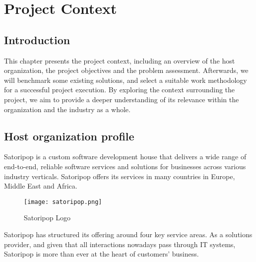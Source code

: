 \chapter{Project Context}
\section*{Introduction}
This chapter presents the project context, including an overview of the host organization, 
the project objectives and the problem assessment. Afterwards, we will benchmark some existing 
solutions, and select a suitable work methodology for a successful project execution. 
By exploring the context surrounding the project, we aim to provide a deeper understanding of 
its relevance within the organization and the industry as a whole.

\section{Host organization profile}

Satoripop is a custom software development house that delivers a wide range of end-to-end, 
reliable software services and solutions for businesses across various industry verticals.
Satoripop offers its services in many countries in Europe, Middle East and Africa.

\begin{figure}[hbt!]
    \centering
    \texttt{[image: satoripop.png]}
    \caption{Satoripop Logo}
    \label{fig:sp-logo}
\end{figure}

Satoripop has structured its offering around four key service areas. As a solutions provider, 
and given that all interactions nowadays pass through IT systems, Satoripop is more than ever at the 
heart of customers' business.

